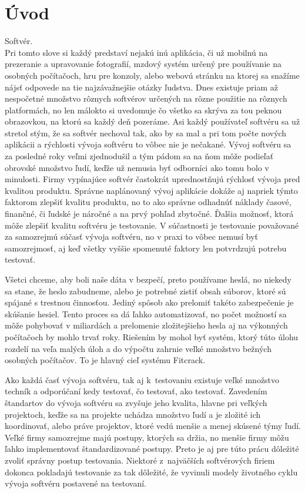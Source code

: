 \chapter{Úvod}
Softvér. \\
Pri tomto slove si každý predstaví nejakú inú aplikácia, či už mobilnú na prezeranie a upravovanie fotografií, mzdový systém určený pre používanie na osobných počítačoch, hru pre konzoly, alebo webovú stránku na ktorej sa snažíme nájsť odpovede na tie najzávažnejšie otázky ľudstva.
Dnes existuje priam až nespočetné množstvo rôznych softvérov určených na rôzne použitie na rôznych platformách, no len málokto si uvedomuje čo všetko sa skrýva za tou peknou obrazovkou, na ktorú sa každý deň pozeráme.
Asi každý používateľ softvéru sa už stretol stým, že sa softvér nechoval tak, ako by sa mal a pri tom počte nových aplikácii a rýchlosti vývoja softvéru to vôbec nie je nečakané. 
Vývoj softvéru sa za posledné roky veľmi zjednodušil a tým pádom sa na ňom môže podieľať obrovské množstvo ľudí, keďže už nemusia byť odborníci ako tomu bolo v minulosti.
Firmy vypínajúce softvér častokrát uprednostňujú rýchlosť vývoja pred kvalitou produktu.
Správne naplánovaný vývoj aplikácie dokáže aj napriek týmto faktorom zlepšiť kvalitu produktu, no to ako správne odhadnúť náklady časové, finančné, či ľudské je náročné a na prvý pohľad zbytočné.
Ďalšia možnosť, ktorá môže zlepšiť kvalitu softvéru je testovanie.
V súčastnosti je testovanie považované za samozrejmú súčasť vývoja softvéru, no v praxi to vôbec nemusí byť samozrejmosť, aj keď všetky vyššie spomenuté faktory len potvrdzujú potrebu testovať.

Všetci chceme, aby boli naše dáta v bezpečí, preto používame heslá, no niekedy sa stane, že heslo zabudneme, alebo je potrebné zistiť obsah súborov, ktoré sú spájané s trestnou činnosťou.
Jediný spôsob ako prelomiť takéto zabezpečenie je skúšanie hesiel.
Tento proces sa dá ľahko automatizovať, no počet možností sa môže pohybovať v miliardách a prelomenie zložitejšieho hesla aj na výkonných počítačoch by mohlo trvať roky.
Riešením by mohol byť systém, ktorý túto úlohu rozdelí na veľa malých úloh a do výpočtu zahrnie veľké množstvo bežných osobných počítačov.
To je hlavný cieľ systému Fitcrack.

Ako každá časť vývoja softvéru, tak aj k~testovaniu existuje veľké množstvo techník a odporúčaní kedy testovať, čo testovať, ako testovať.
Zavedením štandartov do vývoja softvéru sa zvyšuje jeho kvalita, hlavne pri veľkých projektoch, keďže sa na projekte uchádza množstvo ľudí a je zložité ich koordinovať, alebo práve projektov, ktoré vedú menšie a menej skúsené týmy ľudí.
Veľké firmy samozrejme majú postupy, ktorých sa držia, no menšie firmy môžu ľahko implementovať štandardizované postupy.
Preto je aj pre túto prácu dôležité zvoliť správny postup testovania.
Niektoré z~najväčších softvérových firiem dokonca pokladajú testovanie za tak dôležité, že vyvinuli modely životného cyklu vývoja softvéru postavené na testovaní.

